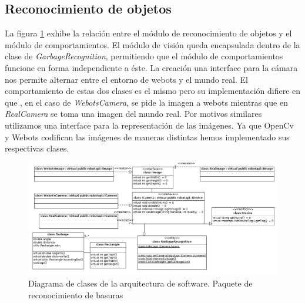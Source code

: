 \subsection{Reconocimiento de objetos}
La figura \ref{fig:soft_arq_reconmodule} exhibe la relaci\'on entre el m\'odulo de reconocimiento de 
objetos y el m\'odulo de comportamientos. El m\'odulo de visi\'on queda encapsulada dentro
de la clase de \textit{GarbageRecognition}, permitiendo que el m\'odulo de comportamientos funcione en
forma independiente a \'este. La creaci\'on una interface para la c\'amara nos permite alternar
entre el entorno de webots y el mundo real. El comportamiento de estas dos clases es el mismo pero 
su implementaci\'on difiere en que , en el caso de \textit{WebotsCamera}, se pide la imagen a webots mientras
que en \textit{RealCamera} se toma una imagen del mundo real. Por motivos similares utilizamos una interface para 
la representaci\'on de las im\'agenes. Ya que OpenCv y Webots codifican las im\'agenes de maneras distintas
hemos implementado sus respectivas clases. 
\begin{landscape}
\begin{figure}[h]
	\centering
	\includegraphics[scale=0.5]{comportamientos/figures/api3.png}
	\caption[Arquitectura de software: m\'odulo de reconocimiento]{Diagrama de clases de
	la arquitectura de software. Paquete de reconocimiento de basuras}
	\label{fig:soft_arq_reconmodule}
\end{figure}
\end{landscape}


% 
% 
% 

